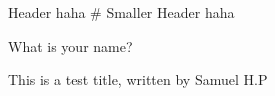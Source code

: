 
Header haha
# Smaller Header haha


What is your name?

This is a test title, written by Samuel H.P

